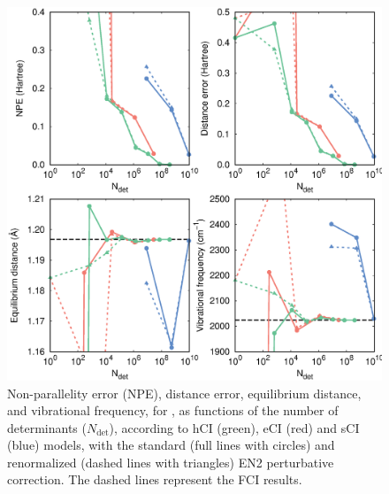 \documentclass[aip,jcp,preprint,noshowkeys,superscriptaddress]{revtex4-1}
\newcommand{\Ndet}{N_\text{det}}
\begin{document}
\begin{figure}%
\includegraphics[width=1.0\linewidth]{plot_pt2_rpt2_CN}
\caption{
Non-parallelity error (NPE), distance error, equilibrium distance, and vibrational frequency, for ,
as functions of the number of determinants ($\Ndet$), according to hCI (green), eCI (red) and sCI (blue) models,
with the standard (full lines with circles) and renormalized (dashed lines with triangles) EN2 perturbative correction.
The dashed lines represent the FCI results.}
\label{fig:plot_pt2_rpt2_cn}
\end{figure}
\end{document}
